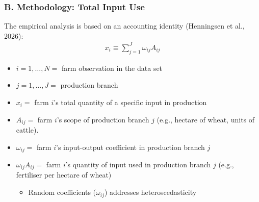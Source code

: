 \documentclass[t,24pt,aspectratio=169]{beamer}
\begin{document}
\begin{frame}[hvid]
\frametitle{\vspace{-3ex}B. Methodology: Total Input Use}
The empirical analysis is based on an accounting identity (Henningsen et al., 2026):
\vspace{-1ex} \begin{align*}
    x_i \equiv \sum_{j=1}^J \omega_{ij} A_{ij}
\end{align*}

\vspace{-1ex} \begin{itemize}
\item $i = 1, \ldots, N =$ farm observation in the data set

\item $j = 1, \ldots, J =$ production branch

\item $x_i = $ farm $i$'s total quantity of a specific input in production

\item $A_{ij} =$ farm $i$'s scope of production branch $j$ (e.g., hectare of wheat, units of cattle).

\item $\omega_{ij} =$ farm $i$'s input-output coefficient in production branch $j$

\item $\omega_{ij} A_{ij} = $ farm $i$'s quantity of input used in production branch $j$ (e.g., fertiliser per hectare of wheat)
\vspace{1ex}

\begin{itemize}
        \item[\fontsize{12pt}{14pt}\selectfont $\rightarrow$]  Random coefficients ($\omega_{ij}$) addresses heteroscedasticity
\end{itemize}

\end{itemize}

\end{frame}
\end{document}
